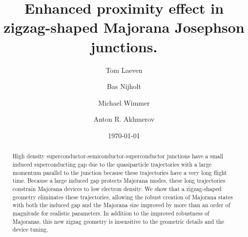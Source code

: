 \documentclass[english, twocolumn, 10pt, aps, superscriptaddress, floatfix, prb, citeautoscript]{revtex4-1}
\begin{document}
\title{Enhanced proximity effect in zigzag-shaped Majorana Josephson junctions.}

\author{Tom Laeven}
\author{Bas Nijholt}
\author{Michael Wimmer}
\author{Anton R. Akhmerov}

\date{\today}
\begin{abstract}
High density superconductor-semiconductor-superconductor junctions have a small induced superconducting gap due to the quasiparticle trajectories with a large momentum parallel to the junction because these trajectories have a very long flight time.
Because a large induced gap protects Majorana modes, these long trajectories constrain Majorana devices to low electron density.
We show that a zigzag-shaped geometry eliminates these trajectories, allowing the robust creation of Majorana states with both the induced gap and the Majorana size improved by more than an order of magnitude for realistic parameters.
In addition to the improved robustness of Majoranas, this new zigzag geometry is insensitive to the geometric details and the device tuning.
\end{abstract}

\maketitle

\end{document}
